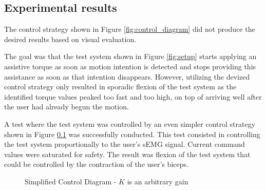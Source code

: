 \FloatBarrier
\subsection{Experimental results}
The control strategy shown in Figure \ref{fig:control_diagram} 
did not produce the desired results based on visual evaluation.  

The goal was that the test system shown in Figure \ref{fig:setup} 
starts applying an assistive torque as soon as motion intention is detected and 
stops providing this assistance as soon as that intention disappears. However, 
utilizing the devized control strategy only resulted in sporadic flexion of the 
test system as the identified torque values peaked too fast and too high, on top 
of arriving well after the user had already begun the motion.  

A test where the test system was controlled by an even simpler control strategy 
shown in Figure \ref{} was successfully conducted. This test consisted in 
controlling the test system proportionally to the user's sEMG signal. Current 
command values were saturated for safety. The result was flexion of the test 
system that could be controlled by the contraction of the user's biceps.  

\begin{figure}[htbp]
    \centering
    \caption{
      Simplified Control Diagram - $K$ is an arbitrary gain 
    }
    \label{fig:simplified_control_diagram}
\end{figure}
\FloatBarrier
